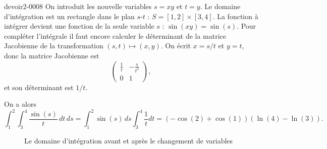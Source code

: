 \begin{corrige}{devoir2-0008}
On introduit les nouvelle variables $s=xy$ et $t=y$. Le domaine d'intégration est un rectangle dans le plan $s$-$t$ : $S= [1,2]\times [3,4]$. La fonction à intégrer devient une fonction de la seule variable $s$ : $\sin(xy)=\sin(s)$. Pour compléter l'intégrale il faut encore calculer le déterminant de la matrice Jacobienne de la transformation $(s,t)\mapsto(x,y)$. On écrit $x=s/t$ et $y=t$, donc la matrice Jacobienne est 
\begin{equation}
  \begin{pmatrix}
    \frac{1}{t} & -\frac{s}{t^2}\\
    0 & 1
  \end{pmatrix},
\end{equation}
  et son déterminant est $1/t$. 

On a alors 
\begin{equation}
  \int_1^2\int_3^ 4\frac{\sin(s)}{t}\, dt\, ds=  \int_1^2\sin(s)\,ds\int_3^ 4 \frac{1}{t}dt = \left(-\cos(2)+ \cos(1)\right)\left(\ln(4)-\ln(3)\right).
\end{equation}

\begin{figure}
    

  \caption{Le domaine d'intégration avant et après le changement de variables}\label{exo7devoir2}
  \end{figure}

\end{corrige}


\clearpage
